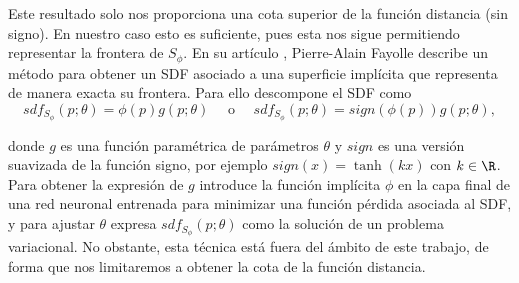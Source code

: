 Este resultado solo nos proporciona una cota superior de la función distancia (sin signo). En nuestro caso esto es suficiente, pues esta nos sigue permitiendo representar la frontera de $S_{\phi}$. En su artículo \cite{art:impSdf}, Pierre-Alain Fayolle describe un método para obtener un SDF asociado a una superficie implícita que representa de manera exacta su frontera. Para ello descompone el SDF como 
\begin{equation*}
    sdf_{S_{\phi}}(p;\theta) = \phi(p)g(p;\theta)\quad \text{ o }\quad sdf_{S_{\phi}}(p;\theta) = sign(\phi(p))g(p;\theta),
\end{equation*}

donde $g$ es una función paramétrica de parámetros $\theta$ y $sign$ es una versión suavizada de la función signo, por ejemplo $sign(x) = \tanh{(kx)}$ con $k\in\R$. Para obtener la expresión de $g$ introduce la función implícita $\phi$ en la capa final de una red neuronal entrenada para  minimizar una función pérdida asociada al SDF, y para ajustar $\theta$ expresa $sdf_{S_{\phi}}(p;\theta)$ como la solución de un problema variacional. No obstante, esta técnica está fuera del ámbito de este trabajo, de forma que nos limitaremos a obtener la cota de la función distancia.
